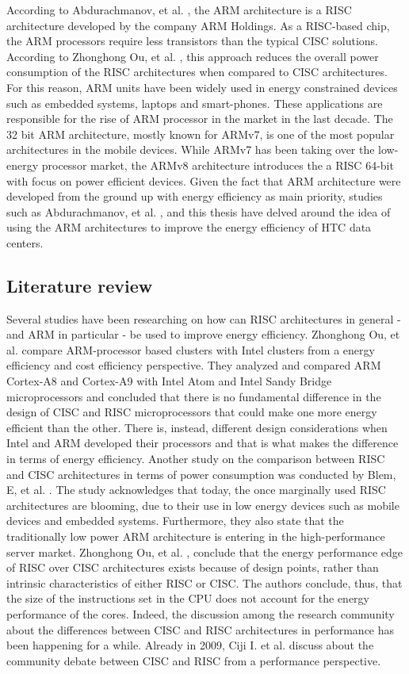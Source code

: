 According to Abdurachmanov, et al. \cite{ARM} , the ARM architecture is a RISC architecture developed by the company ARM Holdings. As a RISC-based chip, the ARM processors require less transistors than the typical CISC solutions. According to Zhonghong Ou, et al. \cite{CISC_RISC}, this approach reduces the overall power consumption of the RISC architectures when compared to CISC architectures. For this reason, ARM units have been widely used in energy constrained devices such as embedded systems, laptops and smart-phones. These applications are responsible for the rise of ARM processor in the market in the last decade. The 32 bit ARM architecture, mostly known for ARMv7, is one of the most popular architectures in the mobile devices. While ARMv7 has been taking over the low-energy processor market, the ARMv8 architecture \cite{ARMv8} introduces the a RISC 64-bit with focus on power efficient devices. 
Given the fact that ARM architecture were developed from the ground up with energy efficiency as main priority, studies such as Abdurachmanov, et al. \cite{ACAT14ARMDAVID}, \cite{ACAT13ARM} and this thesis have delved around the idea of using the ARM architectures to improve the energy efficiency of HTC data centers. 

\subsection*{Literature review}

Several studies have been researching on how can RISC architectures in general - and ARM in particular - be used to improve energy efficiency. Zhonghong Ou, et al.\cite{CISC_RISC} compare ARM-processor based clusters with Intel clusters from a energy efficiency and cost efficiency perspective. They analyzed and compared ARM Cortex-A8 and Cortex-A9 with Intel Atom and Intel Sandy Bridge microprocessors and concluded that there is no fundamental difference in the design of CISC and RISC microprocessors that could make one more energy efficient than the other. There is, instead, different design considerations when Intel and ARM developed their processors and that is what makes the difference in terms of energy efficiency. Another study on the comparison between RISC and CISC architectures in terms of power consumption was conducted by Blem, E, et al. \cite{CISC_RISC_2}. The study acknowledges that today, the once marginally used RISC architectures are blooming, due to their use in low energy devices such as mobile devices and embedded systems. Furthermore, they also state that the traditionally low power ARM architecture is entering in the high-performance server market. Zhonghong Ou, et al. \cite{CISC_RISC}, \cite{CISC_RISC_2} conclude that the energy performance edge of RISC over CISC architectures exists because of design points, rather than intrinsic characteristics of either RISC or CISC. The authors conclude, thus, that the size of the instructions set in the CPU does not account for the energy performance of the cores. Indeed, the discussion among the research community about the differences between CISC and RISC architectures in performance has been happening for a while. Already in 2009, Ciji I. et al. \cite{CR_TALE} discuss about the community debate between CISC and RISC from a performance perspective.  

